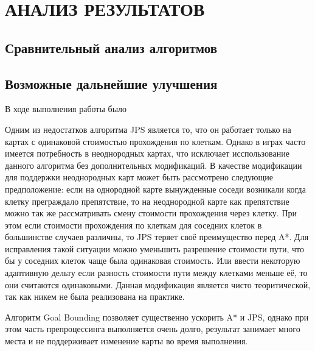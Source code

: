 \section[Анализ результатов]{\MakeTextUppercase{АНАЛИЗ РЕЗУЛЬТАТОВ}}

\subsection{Сравнительный анализ алгоритмов}

\subsection{Возможные дальнейшие улучшения}

В ходе выполнения работы было

Одним из недостатков алгоритма JPS является то, что он работает только на картах с одинаковой стоимостью прохождения по клеткам. Однако в играх часто имеется потребность в неоднородных картах, что исключает исспользование данного алгоритма без дополнительных модификаций. В качестве модификации для поддержки неоднородных карт может быть рассмотрено следующие предположение: если на однородной карте вынужденные соседи возникали когда клетку преграждало препятствие, то на неоднородной карте как препятствие можно так же рассматривать смену стоимости прохождения через клетку. При этом если стоимости прохождения по клеткам для соседних клеток в большинстве случаев различны, то JPS теряет своё преимущество перед A*. Для исправления такой ситуации можно уменьшить разрешение стоимости пути, что бы у соседних клеток чаще была одинаковая стоимость. Или ввести некоторую адаптивную дельту если разность стоимости пути между клетками меньше её, то они считаются одинаковыми. Данная модификация является чисто теоритической, так как никем не была реализована на практике.

Алгоритм Goal Bounding позволяет существенно ускорить A* и JPS, однако при этом часть препроцессинга выполняется очень долго, результат занимает много места и не поддерживает изменение карты во время выполнения. 